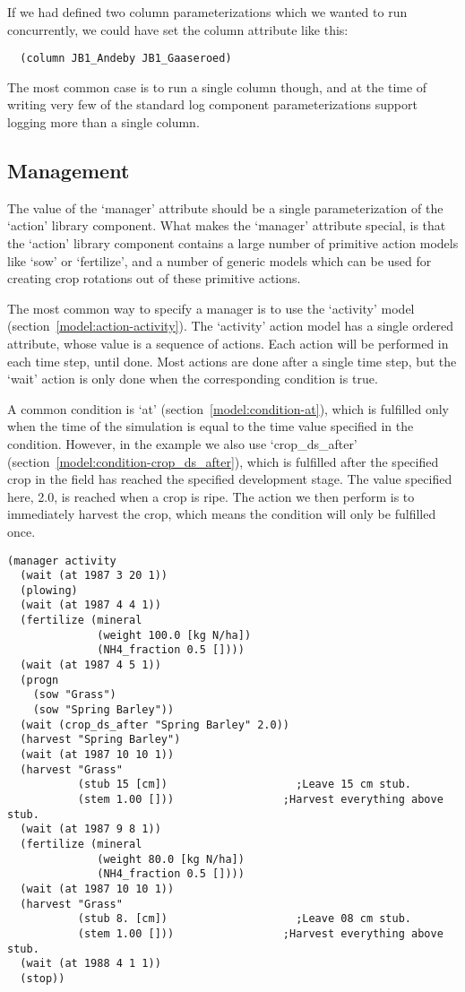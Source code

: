 If we had defined two column parameterizations which we wanted to run
concurrently, we could have set the column attribute like this:

\begin{verbatim}
  (column JB1_Andeby JB1_Gaaseroed)
\end{verbatim}

The most common case is to run a single column though, and at the time
of writing very few of the standard log component parameterizations
support logging more than a single column.

\subsection{Management}
\label{sec:management}

The value of the `manager' attribute should be a single
parameterization of the `action' library component.  What makes the
`manager' attribute special, is that the `action' library component
contains a large number of primitive action models like `sow' or
`fertilize', and a number of generic models which can be used for
creating crop rotations out of these primitive actions.

The most common way to specify a manager is to use the `activity' model
(section~\ref{model:action-activity}).  The `activity' action model has a
single ordered attribute, whose value is a sequence of actions.  Each
action will be performed in each time step, until done.  Most actions
are done after a single time step, but the `wait' action is only done
when the corresponding condition is true.

A common condition is `at' (section~\ref{model:condition-at}), which
is fulfilled only when the time of the simulation is equal to the time
value specified in the condition.  However, in the example we also use
`crop\_ds\_after' (section~\ref{model:condition-crop_ds_after}), which
is fulfilled after the specified crop in the field has reached the
specified development stage.  The value specified here, 2.0, is
reached when a crop is ripe.  The action we then perform is to
immediately harvest the crop, which means the condition will only be
fulfilled once.

\begin{verbatim}
(manager activity
  (wait (at 1987 3 20 1))
  (plowing)
  (wait (at 1987 4 4 1))
  (fertilize (mineral 
              (weight 100.0 [kg N/ha])
              (NH4_fraction 0.5 [])))
  (wait (at 1987 4 5 1))
  (progn 
    (sow "Grass")
    (sow "Spring Barley"))
  (wait (crop_ds_after "Spring Barley" 2.0))
  (harvest "Spring Barley")
  (wait (at 1987 10 10 1))
  (harvest "Grass"
           (stub 15 [cm])                    ;Leave 15 cm stub.
           (stem 1.00 []))                 ;Harvest everything above stub.
  (wait (at 1987 9 8 1))
  (fertilize (mineral
              (weight 80.0 [kg N/ha])
              (NH4_fraction 0.5 [])))
  (wait (at 1987 10 10 1))
  (harvest "Grass"
           (stub 8. [cm])                    ;Leave 08 cm stub.
           (stem 1.00 []))                 ;Harvest everything above stub.
  (wait (at 1988 4 1 1))
  (stop))
\end{verbatim}

